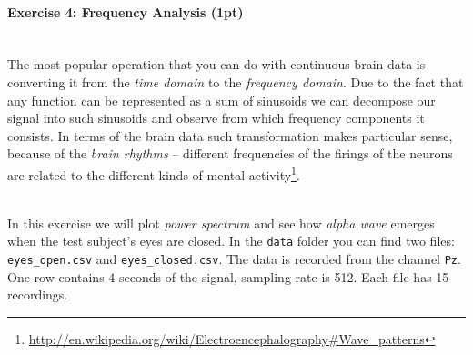 \documentclass[a4paper,11pt]{article}
\newenvironment{exercise}[3]{\paragraph{Exercise #1: #2 (#3pt)}\ \\}{
\medskip}
\begin{document}
%
%
\begin{exercise}{4}{Frequency Analysis}{1}
The most popular operation that you can do with continuous brain data is converting it from the \emph{time domain} to the \emph{frequency domain}. Due to the fact that any function can be represented as a sum of sinusoids we can decompose our signal into such sinusoids and observe from which frequency components it consists. In terms of the brain data such transformation makes particular sense, because of the \emph{brain rhythms} -- different frequencies of the firings of the neurons are related to the different kinds of mental activity\footnote{\url{http://en.wikipedia.org/wiki/Electroencephalography\#Wave_patterns}}.

\ \\
In this exercise we will plot \emph{power spectrum} and see how \emph{alpha wave} emerges when the test subject's eyes are closed. In the \texttt{data} folder you can find two files: \texttt{eyes\_open.csv} and \texttt{eyes\_closed.csv}. The data is recorded from the channel \texttt{Pz}. One row contains 4 seconds of the signal, sampling rate is 512. Each file has 15 recordings.


\end{exercise}
\end{document}
